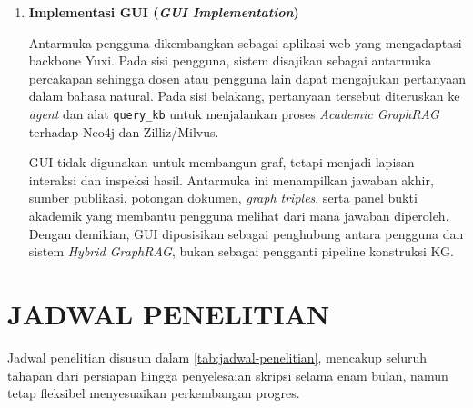 \begin{enumerate}[label=\textbf{\arabic*.}, leftmargin=*, itemsep=10pt]
    \item \textbf{Implementasi GUI (\textit{GUI Implementation})}

          \hspace*{0.75cm}Antarmuka pengguna dikembangkan sebagai aplikasi web yang mengadaptasi backbone Yuxi. Pada sisi pengguna, sistem disajikan sebagai antarmuka percakapan sehingga dosen atau pengguna lain dapat mengajukan pertanyaan dalam bahasa natural. Pada sisi belakang, pertanyaan tersebut diteruskan ke \textit{agent} dan alat \texttt{query\_kb} untuk menjalankan proses \textit{Academic GraphRAG} terhadap Neo4j dan Zilliz/Milvus.

          \hspace*{0.75cm}GUI tidak digunakan untuk membangun graf, tetapi menjadi lapisan interaksi dan inspeksi hasil. Antarmuka ini menampilkan jawaban akhir, sumber publikasi, potongan dokumen, \textit{graph triples}, serta panel bukti akademik yang membantu pengguna melihat dari mana jawaban diperoleh. Dengan demikian, GUI diposisikan sebagai penghubung antara pengguna dan sistem \textit{Hybrid GraphRAG}, bukan sebagai pengganti pipeline konstruksi KG.
\end{enumerate}

\section{JADWAL PENELITIAN}

Jadwal penelitian disusun dalam \ref{tab:jadwal-penelitian}, mencakup seluruh tahapan dari persiapan hingga penyelesaian skripsi selama enam bulan, namun tetap fleksibel menyesuaikan perkembangan progres.

